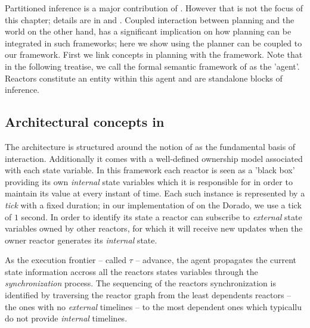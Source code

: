 Partitioned inference is a major contribution of \rx. However that is
not the focus of this chapter; details are in \cite{py10} and
\cite{rajan12}. Coupled interaction between planning and the world on
the other hand, has a significant implication on how planning can be
integrated in such frameworks; here we show using the \eu planner can
be coupled to our framework. First we link concepts in \eu planning
with the \rx framework. Note that in the following treatise, we call
the formal semantic framework of \rx as the 'agent'. Reactors
constitute an entity within this agent and are standalone blocks of
inference.


\subsection{Architectural concepts in \rx}
\label{sec:arch:trex}

The \rx architecture is structured around the notion of  as the fundamental basis of interaction. Additionally it
comes with a well-defined ownership model associated with each state
variable. In this framework each reactor is seen as a 'black box'
providing its own {\em internal} state variables which it is
responsible for in order to maintain its value at every instant of
time. Each such instance is represented by a {\em tick} with a fixed
duration; in our implementation of \rx on the Dorado, we use a tick of
$1$ second. In order to identify its state a reactor can subscribe to
{\em external} state variables owned by other reactors, for which it
will receive new updates when the owner reactor generates its {\em
  internal} state. 

As the execution frontier -- called $\tau$ -- advance, the \rx agent
propagates the current state information accross all the reactors states
variables through the {\em synchronization} process.
 The sequencing of the reactors synchronization is identified
by traversing the reactor graph from the least dependents reactors --
the ones with no {\em external} timelines -- to the most dependent
ones which typicallu do not provide {\em internal} timelines.


